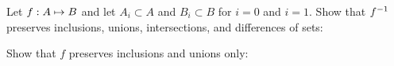 \documentclass[../main.tex]{subfiles}
\begin{document}
\problem{}\label{s2p2}

Let \({f}: {A} \mapsto{} {B}\) and let \(A_i \subset A\) and \(B_i \subset B\) for
\(i = 0\) and \(i = 1\). Show that \({f}^{-1}\) preserves inclusions, unions,
intersections, and differences of sets:






Show that \(f\) preserves inclusions and unions only:





\end{document}
